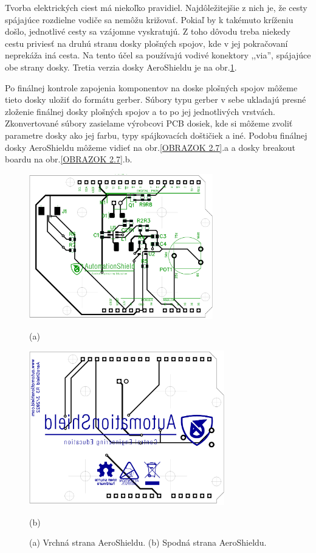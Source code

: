 Tvorba elektrických ciest má niekoľko pravidiel. Najdôležitejšie z nich je, že cesty spájajúce rozdielne vodiče sa nemôžu križovať. Pokiaľ by k takémuto kríženiu došlo, jednotlivé cesty sa vzájomne vyskratujú. Z toho dôvodu treba niekedy cestu priviesť na druhú stranu dosky plošných spojov, kde v jej pokračovaní neprekáža iná cesta. Na tento účel sa používajú vodivé konektory ,,via'', spájajúce obe strany dosky. Tretia verzia dosky AeroShieldu je na obr.\ref{OBRAZOK 2.4}. 

Po finálnej kontrole zapojenia komponentov na doske plošných spojov môžeme tieto dosky uložiť do formátu gerber. Súbory typu gerber v sebe ukladajú presné zloženie finálnej dosky plošných spojov a to po jej jednotlivých vrstvách. Zkonvertované súbory zasielame výrobcovi PCB dosiek, kde si môžeme zvoliť parametre dosky ako jej farbu, typy spájkovacích doštičiek a iné. Podobu finálnej dosky AeroShieldu môžeme vidieť na obr.\ref{OBRAZOK 2.7}.a a dosky breakout boardu na obr.\ref{OBRAZOK 2.7}.b.

\begin{figure}[!tbh]
	\centering
	\includegraphics[width=8cm]{obr/AeroShield3TOP.png}
	
	(a)
	
	\includegraphics[width=8.5cm]{obr/AeroShield3BOTTOM.png}
	
	(b)
	
	\caption{(a) Vrchná strana AeroShieldu. (b) Spodná strana AeroShieldu.}
	\label{OBRAZOK 2.4}
\end{figure}



